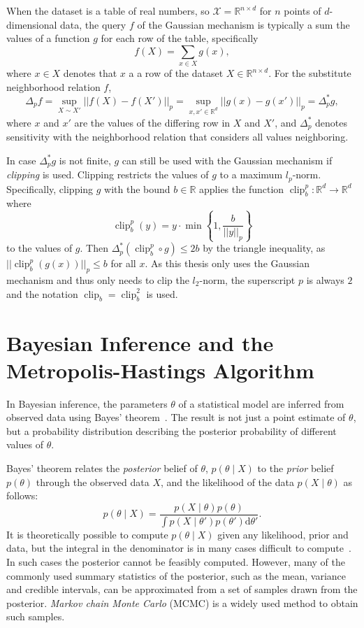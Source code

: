 \documentclass[english,twoside,openright]{HYgraduMLDS}
\newcommand{\R}{\mathbb{R}}
\newcommand{\dx}{\mathrm{d}}
\newcommand{\calx}{{\mathcal{X}}}
\DeclareMathOperator{\clip}{clip}
\begin{document}
When the dataset is a table of real numbers, so \(\calx = \R^{n\times d}\) for
\(n\) points of \(d\)-dimensional data,
the query \(f\) of the Gaussian mechanism is
typically a sum the values of a function \(g\) for each row of the table,
specifically
\[
  f(X) = \sum_{x\in X} g(x),
\]
where \(x\in X\) denotes that \(x\) a a row of the dataset \(X\in \R^{n\times d}\).
For the substitute neighborhood relation \(f\),
\[
  \Delta_{p}f = \sup_{X\sim X'}||f(X) - f(X')||_{p}
  = \sup_{x, x'\in \R^{d}}||g(x) - g(x')||_{p}
  = \Delta^{*}_{p}g,
\]
where \(x\) and \(x'\) are the values of the differing row in \(X\) and \(X'\),
and \(\Delta^{*}_{p}\) denotes sensitivity with the neighborhood relation that
considers all values neighboring.

In case \(\Delta^{*}_{p}g\) is not finite, \(g\) can still be used with
the Gaussian mechanism if \emph{clipping} is used. Clipping restricts the
values of \(g\) to a maximum \(l_{p}\)-norm. Specifically, clipping
\(g\) with the bound \(b\in \R\) applies
the function \(\clip_{b}^{p}\colon \R^{d}\to \R^{d}\) where
\[
  \clip_{b}^{p}(y) = y\cdot\min\left\{1, \frac{b}{||y||_{p}}\right\}
\]
to the values of \(g\). Then \(\Delta^{*}_{p}(\clip_{b}^{p} \circ g) \leq 2b\) by the
triangle inequality, as \(||\clip_{b}^{p}(g(x))||_{p} \leq b\) for
all \(x\). As this thesis only uses the Gaussian mechanism and
thus only needs to clip the \(l_{2}\)-norm, the superscript \(p\) is always
\(2\) and the notation \(\clip_{b} = \clip_{b}^{2}\) is used.

\section{Bayesian Inference and the Metropolis-Hastings Algorithm}\label{MCMC_background}

In Bayesian inference, the parameters \(\theta\) of a statistical model are
inferred from 
observed data using Bayes' theorem~\cite{BDA}. The result is not just a point estimate 
of \(\theta\), but a probability distribution describing the posterior probability
of different values of \(\theta\).

Bayes' theorem relates the \emph{posterior} belief of \(\theta\),
\(p(\theta \mid X)\) to the \emph{prior} belief \(p(\theta)\) through the 
observed data \(X\), and the likelihood of the data \(p(X\mid \theta)\) as follows:
\[
    p(\theta \mid X) = \frac{p(X \mid \theta)p(\theta)}
    {\int p(X\mid \theta')p(\theta')\dx\theta'}.
\]
It is theoretically possible to compute \(p(\theta \mid X)\) given any 
likelihood, prior and data, but the integral in the denominator is in many 
cases difficult to compute~\cite{BDA}. In such cases the posterior cannot be feasibly 
computed. However, many of the commonly used summary statistics of the posterior, 
such as the mean, variance and credible intervals, can be approximated from 
a set of samples drawn from the posterior. \emph{Markov chain Monte Carlo}
(MCMC) is a widely used method to obtain such samples.
\end{document}
